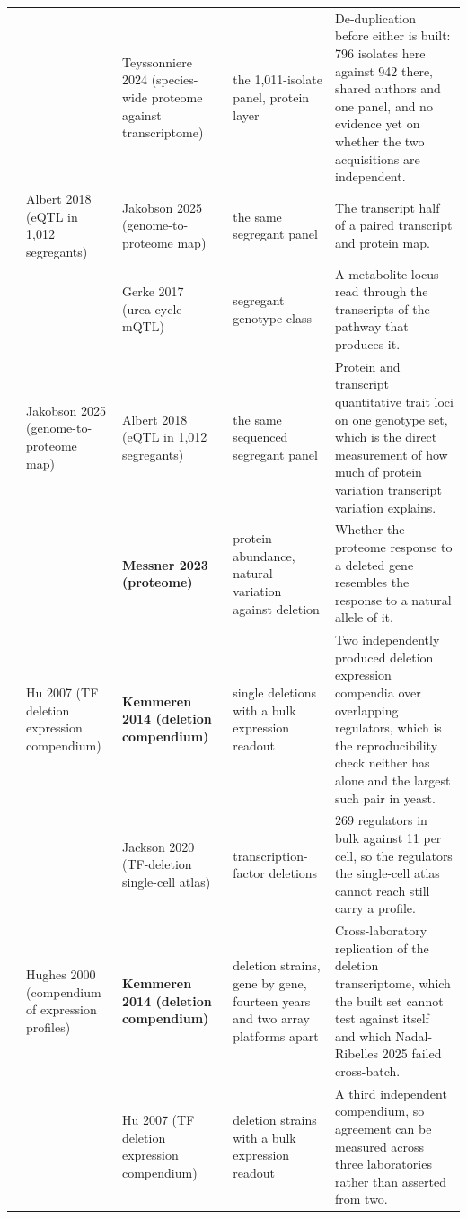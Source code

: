 \begin{landscape}
\begin{longtable}{@{}r@{\hspace{4pt}} L{42mm} L{44mm} L{48mm} L{96mm}@{}}
 &  & Teyssonniere 2024 (species-wide proteome against transcriptome) & the 1,011-isolate panel, protein layer & De-duplication before either is built: 796 isolates here against 942 there, shared authors and one panel, and no evidence yet on whether the two acquisitions are independent. \\
 & Albert 2018 (eQTL in 1,012 segregants) & Jakobson 2025 (genome-to-proteome map) & the same segregant panel & The transcript half of a paired transcript and protein map. \\
 &  & Gerke 2017 (urea-cycle mQTL) & segregant genotype class & A metabolite locus read through the transcripts of the pathway that produces it. \\
 & Jakobson 2025 (genome-to-proteome map) & Albert 2018 (eQTL in 1,012 segregants) & the same sequenced segregant panel & Protein and transcript quantitative trait loci on one genotype set, which is the direct measurement of how much of protein variation transcript variation explains. \\
 &  & \textbf{Messner 2023 (proteome)} & protein abundance, natural variation against deletion & Whether the proteome response to a deleted gene resembles the response to a natural allele of it. \\
 & Hu 2007 (TF deletion expression compendium) & \textbf{Kemmeren 2014 (deletion compendium)} & single deletions with a bulk expression readout & Two independently produced deletion expression compendia over overlapping regulators, which is the reproducibility check neither has alone and the largest such pair in yeast. \\
 &  & Jackson 2020 (TF-deletion single-cell atlas) & transcription-factor deletions & 269 regulators in bulk against 11 per cell, so the regulators the single-cell atlas cannot reach still carry a profile. \\
 & Hughes 2000 (compendium of expression profiles) & \textbf{Kemmeren 2014 (deletion compendium)} & deletion strains, gene by gene, fourteen years and two array platforms apart & Cross-laboratory replication of the deletion transcriptome, which the built set cannot test against itself and which Nadal-Ribelles 2025 failed cross-batch. \\
 &  & Hu 2007 (TF deletion expression compendium) & deletion strains with a bulk expression readout & A third independent compendium, so agreement can be measured across three laboratories rather than asserted from two. \\

\end{longtable}
\end{landscape}
